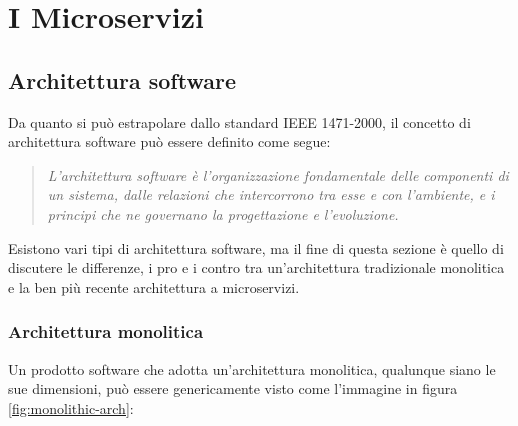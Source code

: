 
\chapter{I Microservizi}



\section{Architettura software}

Da quanto si può estrapolare dallo standard IEEE 1471-2000, il concetto di architettura software può essere definito come segue:
\begin{quotation}
	\noindent \textit{L'architettura software è l'organizzazione fondamentale delle componenti di un sistema, dalle relazioni che intercorrono tra esse e con l'ambiente, e i principi che ne governano la progettazione e l'evoluzione.}
\end{quotation} 

Esistono vari tipi di architettura software, ma il fine di questa sezione è quello di discutere le differenze, i pro e i contro tra un'architettura tradizionale monolitica e la ben più recente architettura a microservizi.

\clearpage

\subsection{Architettura monolitica}
Un prodotto software che adotta un'architettura monolitica, qualunque siano le sue dimensioni, può essere genericamente visto come l'immagine in figura  \ref{fig:monolithic-arch}:

